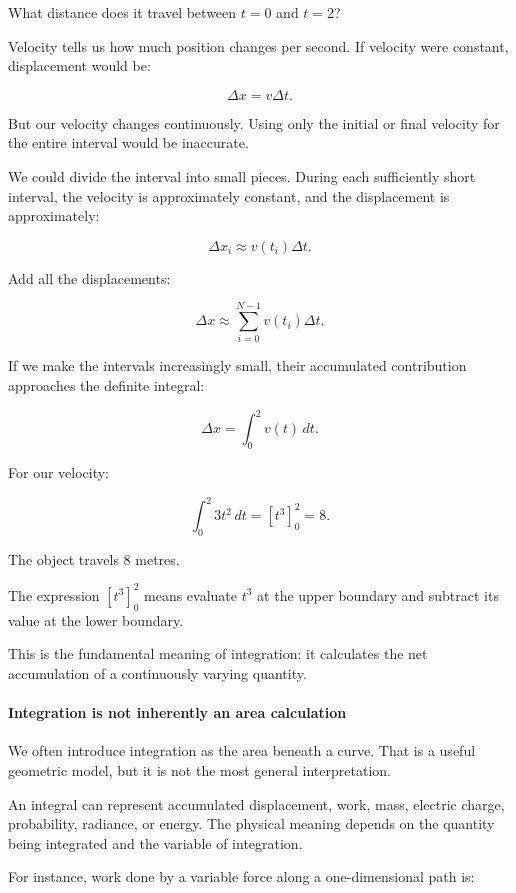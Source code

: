 What distance does it travel between \(t=0\) and \(t=2\)?

Velocity tells us how much position changes per second. If velocity were constant, displacement would be:

\[
\Delta x=v\Delta t.
\]

But our velocity changes continuously. Using only the initial or final velocity for the entire interval would be inaccurate.

We could divide the interval into small pieces. During each sufficiently short interval, the velocity is approximately constant, and the displacement is approximately:

\[
\Delta x_i\approx v(t_i)\Delta t.
\]

Add all the displacements:

\[
\Delta x\approx\sum_{i=0}^{N-1}v(t_i)\Delta t.
\]

If we make the intervals increasingly small, their accumulated contribution approaches the definite integral:

\[
\boxed{\Delta x=\int_0^2v(t)\,dt}.
\]

For our velocity:

\[
\int_0^2 3t^2\,dt = \left[t^3\right]_0^2=8.
\]

The object travels 8 metres.

The expression \([t^3]_0^2\) means evaluate \(t^3\) at the upper boundary and subtract its value at the lower boundary.

This is the fundamental meaning of integration: it calculates the net accumulation of a continuously varying quantity.

\paragraph{Integration is not inherently an area calculation}\label{02-foundations-ii-ch022-integration-is-not-inherently-an-area-calculation}

We often introduce integration as the area beneath a curve. That is a useful geometric model, but it is not the most general interpretation.

An integral can represent accumulated displacement, work, mass, electric charge, probability, radiance, or energy. The physical meaning depends on the quantity being integrated and the variable of integration.

For instance, work done by a variable force along a one-dimensional path is:

